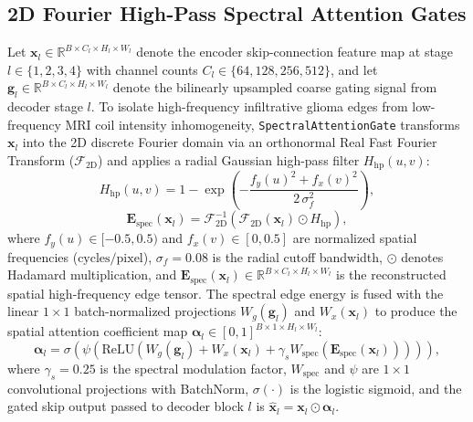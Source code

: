 \documentclass[conference]{IEEEtran}
\begin{document}
\subsection{2D Fourier High-Pass Spectral Attention Gates}
Let $\mathbf{x}_l \in \mathbb{R}^{B \times C_l \times H_l \times W_l}$ denote the encoder skip-connection feature map at stage $l \in \{1, 2, 3, 4\}$ with channel counts $C_l \in \{64, 128, 256, 512\}$, and let $\mathbf{g}_l \in \mathbb{R}^{B \times C_l \times H_l \times W_l}$ denote the bilinearly upsampled coarse gating signal from decoder stage $l$. To isolate high-frequency infiltrative glioma edges from low-frequency MRI coil intensity inhomogeneity, \texttt{SpectralAttentionGate} transforms $\mathbf{x}_l$ into the 2D discrete Fourier domain via an orthonormal Real Fast Fourier Transform ($\mathcal{F}_{\text{2D}}$) and applies a radial Gaussian high-pass filter $H_{\text{hp}}(u,v)$:
\begin{equation}
    H_{\text{hp}}(u,v) = 1 - \exp\!\left(-\frac{f_y(u)^2 + f_x(v)^2}{2\,\sigma_f^2}\right),
    \label{eq:fft_hp}
\end{equation}
\begin{equation}
    \mathbf{E}_{\text{spec}}(\mathbf{x}_l) = \mathcal{F}_{\text{2D}}^{-1}\!\left(\mathcal{F}_{\text{2D}}(\mathbf{x}_l) \odot H_{\text{hp}}\right),
    \label{eq:fft_edges}
\end{equation}
where $f_y(u) \in [-0.5, 0.5)$ and $f_x(v) \in [0, 0.5]$ are normalized spatial frequencies ($\text{cycles/pixel}$), $\sigma_f = 0.08$ is the radial cutoff bandwidth, $\odot$ denotes Hadamard multiplication, and $\mathbf{E}_{\text{spec}}(\mathbf{x}_l) \in \mathbb{R}^{B \times C_l \times H_l \times W_l}$ is the reconstructed spatial high-frequency edge tensor. The spectral edge energy is fused with the linear $1\times 1$ batch-normalized projections $W_g(\mathbf{g}_l)$ and $W_x(\mathbf{x}_l)$ to produce the spatial attention coefficient map $\boldsymbol{\alpha}_l \in [0,1]^{B \times 1 \times H_l \times W_l}$:
\begin{equation}
    \boldsymbol{\alpha}_l = \sigma\!\left(\psi\!\left(\text{ReLU}\!\left(W_g(\mathbf{g}_l) + W_x(\mathbf{x}_l) + \gamma_s W_{\text{spec}}(\mathbf{E}_{\text{spec}}(\mathbf{x}_l))\right)\right)\right),
    \label{eq:spec_gate}
\end{equation}
where $\gamma_s = 0.25$ is the spectral modulation factor, $W_{\text{spec}}$ and $\psi$ are $1\times 1$ convolutional projections with BatchNorm, $\sigma(\cdot)$ is the logistic sigmoid, and the gated skip output passed to decoder block $l$ is $\hat{\mathbf{x}}_l = \mathbf{x}_l \odot \boldsymbol{\alpha}_l$.
\end{document}
